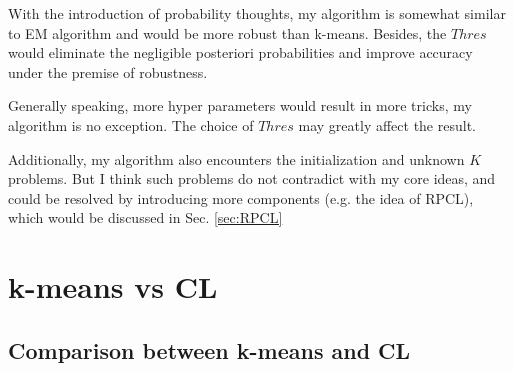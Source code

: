\documentclass[12pt,a4paper]{article}
\theoremstyle{definition}
\begin{document}
With the introduction of probability thoughts, my algorithm is somewhat similar to EM algorithm and would be more robust than k-means. Besides, the $Thres$ would eliminate the negligible posteriori probabilities and improve accuracy under the premise of robustness.

Generally speaking, more hyper parameters would result in more tricks, my algorithm is no exception. The choice of $Thres$ may greatly affect the result.

Additionally, my algorithm also encounters the initialization and unknown $K$ problems. But I think such problems do not contradict with my core ideas, and could be resolved by introducing more components (e.g. the idea of RPCL), which would be discussed in Sec. \ref{sec:RPCL}

\vspace{-1\baselineskip}
\section{k-means vs CL}

\subsection{Comparison between k-means and CL}
\end{document}
